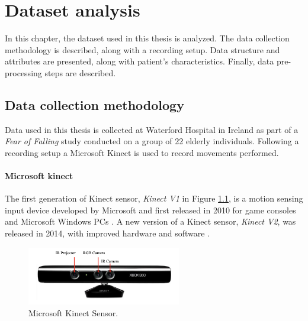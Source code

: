 \hypersetup{colorlinks=true, linkcolor=blue, citecolor=red}

\chapter{Dataset analysis} \label{chap:dataset_analysis}

    In this chapter, the dataset used in this thesis is analyzed. The data collection methodology is described, along with a recording setup. Data structure and attributes are presented, along with patient's characteristics. Finally, data pre-processing steps are described.

    \section{Data collection methodology}
        
        Data used in this thesis is collected at Waterford Hospital in Ireland as part of a \textit{Fear of Falling} study conducted on a group of 22 elderly individuals. Following a recording setup a Microsoft Kinect is used to record movements performed. 

        \subsubsection{Microsoft kinect}

            The first generation of Kinect sensor, \textit{Kinect V1} in Figure \ref{fig:kinect_sensor}, is a motion sensing input device developed by Microsoft and first released in 2010 for game consoles and Microsoft Windows PCs \cite{xu_validity_2015}. A new version of a Kinect sensor, \textit{Kinect V2}, was released in 2014, with improved hardware and software \cite{cruz_kinect_2012}. 

            \begin{figure}[H]
                \centering
                \includegraphics[width=0.6\textwidth]{./resources/images/kinect/kinect.png}
                \caption{Microsoft Kinect Sensor.}
                \label{fig:kinect_sensor}
            \end{figure}

